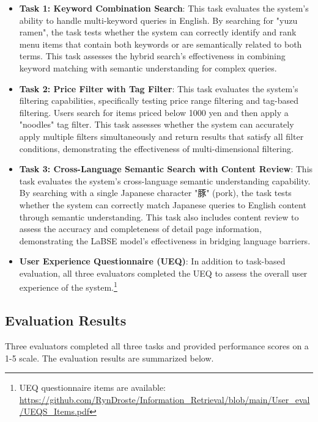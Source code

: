 \documentclass[11pt,a4paper]{article}
\begin{document}
\begin{itemize}
    \item \textbf{Task 1: Keyword Combination Search}: This task evaluates the system's ability to handle multi-keyword queries in English. By searching for "yuzu ramen", the task tests whether the system can correctly identify and rank menu items that contain both keywords or are semantically related to both terms. This task assesses the hybrid search's effectiveness in combining keyword matching with semantic understanding for complex queries.
    
    \item \textbf{Task 2: Price Filter with Tag Filter}: This task evaluates the system's filtering capabilities, specifically testing price range filtering and tag-based filtering. Users search for items priced below 1000 yen and then apply a "noodles" tag filter. This task assesses whether the system can accurately apply multiple filters simultaneously and return results that satisfy all filter conditions, demonstrating the effectiveness of multi-dimensional filtering.
    
    \item \textbf{Task 3: Cross-Language Semantic Search with Content Review}: This task evaluates the system's cross-language semantic understanding capability. By searching with a single Japanese character "豚" (pork), the task tests whether the system can correctly match Japanese queries to English content through semantic understanding. This task also includes content review to assess the accuracy and completeness of detail page information, demonstrating the LaBSE model's effectiveness in bridging language barriers.
    
    \item \textbf{User Experience Questionnaire (UEQ)}: In addition to task-based evaluation, all three evaluators completed the UEQ to assess the overall user experience of the system.\footnote{UEQ questionnaire items are available: \url{https://github.com/RynDroste/Information_Retrieval/blob/main/User_eval/UEQS_Items.pdf}}
\end{itemize}

\subsection{Evaluation Results}

Three evaluators completed all three tasks and provided performance scores on a 1-5 scale. The evaluation results are summarized below.
\end{document}
